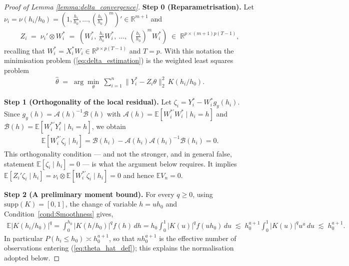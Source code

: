 \documentclass{article}
\newcommand{\normm}[1]{\lVert#1\rVert}
\newcommand{\E}{\mathbb{E}}
\newcommand{\R}{\mathbb{R}}
\begin{document}
\begin{appendices}
\begin{proof}[Proof of Lemma \ref{lemma:delta_convergence}]
    \textbf{Step 0 (Reparametrisation).}
    Let $\nu_i = \nu(h_i/h_0) = \left(1,\tfrac{h_i}{h_0},\dots,(\tfrac{h_i}{h_0})^m\right)'
    \in\R^{m+1}$ and
    \begin{align*}
        Z_i \;=\; \nu_i'\otimes W_i^{*}
        \;=\;\left(W_i^{*},\ \tfrac{h_i}{h_0}W_i^{*},\ \dots,\ (\tfrac{h_i}{h_0})^m W_i^{*}\right)
        \;\in\;\R^{p\times (m+1)p(T-1)} ,
    \end{align*}
    recalling that $W_i^{*}=X_i^{*}W_i\in\R^{p\times p(T-1)}$ and $T=p$. With this
    notation the minimisation problem (\ref{eq:delta_estimation}) is the weighted
    least squares problem
    \begin{align}\label{eq:theta_hat_def}
        \hat{\theta} \;=\; \arg\min_{\theta}\ \sum_{i=1}^n
        \normm{Y_i^{*}-Z_i\theta}_2^2\,K(h_i/h_0).
    \end{align}

    \textbf{Step 1 (Orthogonality of the local residual).}
    Let $\zeta_i = Y_i^{*}-W_i^{*}g_y(h_i)$. Since
    $g_y(h)=\mathcal{A}(h)^{-1}\mathcal{B}(h)$ with
    $\mathcal{A}(h)=\E[W_i^{*\prime}W_i^{*}\mid h_i=h]$ and
    $\mathcal{B}(h)=\E[W_i^{*\prime}Y_i^{*}\mid h_i=h]$, we obtain
    \begin{align}\label{eq:orthogonality}
        \E\!\left[W_i^{*\prime}\zeta_i \mid h_i\right]
        = \mathcal{B}(h_i)-\mathcal{A}(h_i)\mathcal{A}(h_i)^{-1}\mathcal{B}(h_i)=0 .
    \end{align}
    This orthogonality condition — and not the stronger, and in general false,
    statement $\E[\zeta_i\mid h_i]=0$ — is what the argument below requires. It
    implies $\E\!\left[Z_i'\zeta_i\mid h_i\right]=\nu_i\otimes\E[W_i^{*\prime}\zeta_i\mid h_i]=0$
    and hence $\E V_n=0$.

    \textbf{Step 2 (A preliminary moment bound).}
    For every $q\ge 0$, using $\mathrm{supp}(K)=[0,1]$, the change of variable
    $h=uh_0$ and Condition~\ref{cond:Smoothness} gives,
    \begin{align}\label{eq:kernel_moment}
        \E\left|K(h_i/h_0)\right|^{q}
        = \int_0^{h_0}\left|K(h/h_0)\right|^{q}f(h)\,dh
        = h_0\int_0^1 \left|K(u)\right|^{q}f(uh_0)\,du
        \;\lesssim\; h_0^{a+1}\int_0^1 \left|K(u)\right|^{q}u^{a}\,du
        \;\lesssim\; h_0^{a+1}.
    \end{align}
    In particular $P(h_i\le h_0)\asymp h_0^{a+1}$, so that $nh_0^{a+1}$ is the
    effective number of observations entering (\ref{eq:theta_hat_def}); this
    explains the normalisation adopted below.


\end{proof}
\end{appendices}
\end{document}
